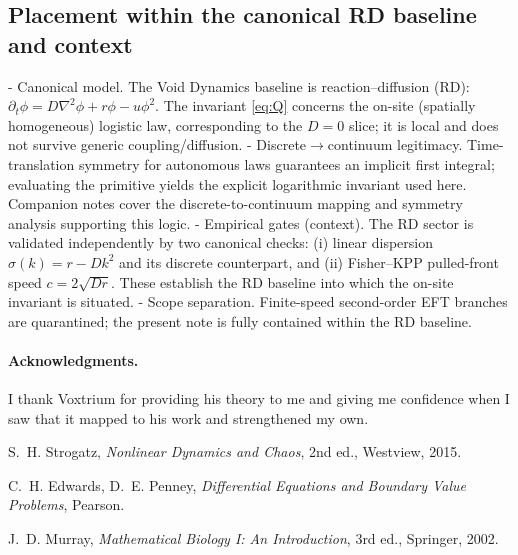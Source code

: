 \documentclass[11pt]{article}
\begin{document}
\subsection*{Placement within the canonical RD baseline and context}
- Canonical model. The Void Dynamics baseline is reaction--diffusion (RD): $\partial_t \phi = D\nabla^2\phi + r\phi - u\phi^2$. The invariant \eqref{eq:Q} concerns the on-site (spatially homogeneous) logistic law, corresponding to the $D=0$ slice; it is local and does not survive generic coupling/diffusion.
- Discrete$\to$continuum legitimacy. Time-translation symmetry for autonomous laws guarantees an implicit first integral; evaluating the primitive yields the explicit logarithmic invariant used here. Companion notes cover the discrete-to-continuum mapping and symmetry analysis supporting this logic.
- Empirical gates (context). The RD sector is validated independently by two canonical checks: (i) linear dispersion $\sigma(k)=r-Dk^2$ and its discrete counterpart, and (ii) Fisher--KPP pulled-front speed $c=2\sqrt{Dr}$. These establish the RD baseline into which the on-site invariant is situated.
- Scope separation. Finite-speed second-order EFT branches are quarantined; the present note is fully contained within the RD baseline.

\paragraph{Acknowledgments.}
I thank Voxtrium for providing his theory to me and giving me confidence when I saw that it mapped to his work and strengthened my own.

\begin{thebibliography}{9}
S.~H. Strogatz, \emph{Nonlinear Dynamics and Chaos}, 2nd ed., Westview, 2015.

C.~H. Edwards, D.~E. Penney, \emph{Differential Equations and Boundary Value Problems}, Pearson.

J.~D. Murray, \emph{Mathematical Biology I: An Introduction}, 3rd ed., Springer, 2002.
\end{thebibliography}
\end{document}
